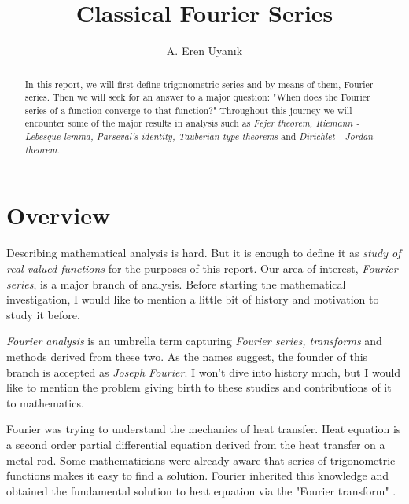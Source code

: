 \documentclass[12pt]{amsart}
\theoremstyle{definition}
\begin{document}
\title[Classical Fourier Series]{Classical Fourier Series}


\author{A. Eren Uyanık}


\begin{abstract}

In this report, we will first define trigonometric series and by means of them, Fourier series. Then we will seek for an answer to a major question: "When does the Fourier series of a function converge to that function?" Throughout this journey we will encounter some of the major results in analysis such as \emph{Fejer theorem, Riemann - Lebesque lemma, Parseval's identity, Tauberian type theorems} and \emph{Dirichlet - Jordan theorem}.
\end{abstract}
\maketitle


\section*{Overview} %





Describing mathematical analysis is hard. But it is enough to define it as \emph{study of real-valued functions} \cite{History} for the purposes of this report. Our area of interest, \emph{Fourier series}, is a major branch of analysis. Before starting the mathematical investigation, I would like to mention a little bit of history and motivation to study it before. 


\emph{Fourier analysis} is an umbrella term capturing \emph{Fourier series, transforms} and methods derived from these two. As the names suggest, the founder of this branch is accepted as \emph{Joseph Fourier}. I won't dive into history much, but I would like to mention the problem giving birth to these studies and contributions of it to mathematics.


Fourier was trying to understand the mechanics of heat transfer. Heat equation is a second order partial differential equation derived from the heat transfer on a metal rod. Some mathematicians were already aware that series of trigonometric functions makes it easy to find a solution. Fourier inherited this knowledge and obtained the fundamental solution to heat equation via the "Fourier transform" \cite{History}.
\end{document}

